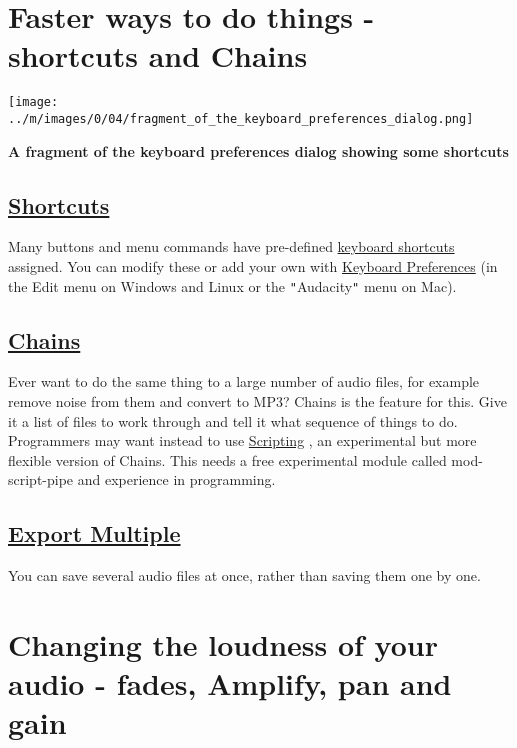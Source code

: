 \documentclass[]{book}
\begin{document}
\begin{multicols}{2}

\section{Faster ways to do things - shortcuts and Chains}

\par\texttt{[image: ../m/images/0/04/fragment\_of\_the\_keyboard\_preferences\_dialog.png]}\par\textbf{A fragment of the keyboard preferences dialog showing some shortcuts}

\subsection{
\hyperref[keyboard_shortcut_reference_]{Shortcuts}
}


Many buttons and menu commands have pre-defined 
\hyperref[keyboard_shortcut_reference_]{keyboard shortcuts}
 assigned.  You can modify these or add your own with 
\hyperref[keyboard_preferences_]{Keyboard Preferences}
 (in the Edit menu on Windows and Linux or the \texttt{{}"{}}Audacity\texttt{{}"{}} menu on Mac). 

\subsection{
\hyperref[chains_for_batch_processing_and_effects_automation_]{Chains}
}


Ever want to do the same thing to a large number of audio files, for example remove noise from them and convert to MP3?  Chains is the feature for this. Give it a list of files to work through and tell it what sequence of things to do. Programmers may want instead to use 
\hyperref[scripting_]{Scripting}
, an experimental but more flexible version of Chains. This needs a free experimental module called mod-script-pipe and experience in programming.

\subsection{
\hyperref[export_multiple_]{Export Multiple}
}


You can save several audio files at once, rather than saving them one by one.



\section{Changing the loudness of your audio - fades, Amplify, pan and gain}


\end{multicols}
\end{document}
